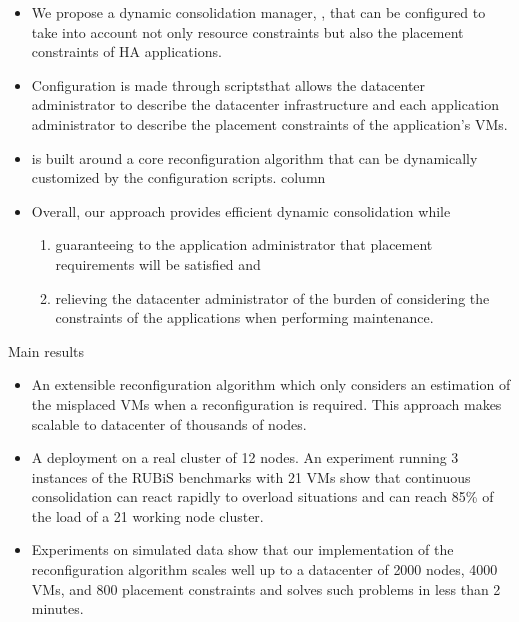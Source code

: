 

\begin{frame}{\Plasma}
\begin{itemize}
\item<1-> We propose a dynamic consolidation manager, \Plasma, that
can be configured to take into account not only \alert{resource constraints} 
but also the \alert{placement constraints} of HA applications. 

\item<2-> Configuration is made through scriptsthat allows the datacenter 
administrator to describe the datacenter infrastructure
and each application administrator to describe the placement constraints
of the application’s VMs. 

\item<3-> \Plasma is built around a core reconfiguration algorithm
that can be dynamically customized by the configuration scripts. column

\item<4-> Overall, our approach provides \alert{efficient dynamic consolidation} while 
\begin{enumerate}
\item<5-> guaranteeing to
the application administrator that \alert{placement requirements} will be 
satisfied and
\item<6-> relieving the datacenter administrator of the burden of considering 
the \alert{ constraints
of the applications} when performing maintenance.
\end{enumerate}
\end{itemize}
\end{frame}


\begin{frame}{Main results}
\begin{itemize}
\item<1-> \alert{An extensible reconfiguration algorithm} which only considers an estimation
of the misplaced VMs when a reconfiguration is required. This approach
makes \Plasma scalable to datacenter of thousands of nodes.
\item<2-> A deployment on a real cluster of 12 nodes. An experiment running 3
instances of the RUBiS benchmarks with 21 VMs show that continuous
consolidation can react rapidly to overload situations and can reach 
\alert{85\%} of the load of a 21 working node cluster.
\item<3-> Experiments on simulated data show that our implementation of the 
reconfiguration algorithm scales well up to a datacenter of \alert{2000 nodes, 4000
VMs, and 800 placement constraints} and solves such problems in \alert{less than
2 minutes}.
\end{itemize}
\end{frame}

